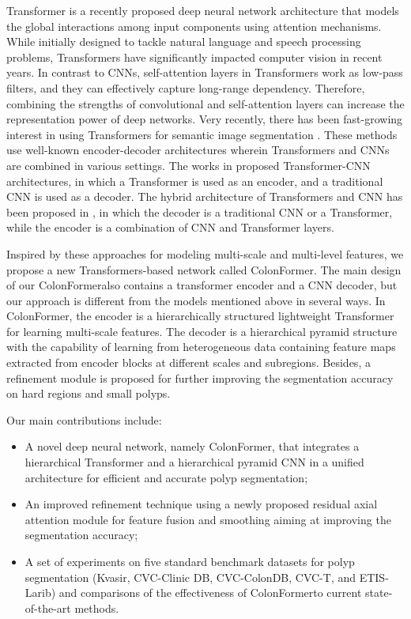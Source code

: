 \documentclass{article}
\newcommand{\ModelName}{ColonFormer}
\begin{document}
Transformer \cite{transformer2017} is a recently proposed deep neural network architecture that models the global interactions among input components using attention mechanisms. While initially designed to tackle natural language and speech processing problems, Transformers have significantly impacted computer vision in recent years. In contrast to CNNs, self-attention layers in Transformers work as low-pass filters, and they can effectively capture long-range dependency. Therefore, combining the strengths of convolutional and self-attention layers can increase the representation power of deep networks. 
Very recently, there has been fast-growing interest in using Transformers for semantic image segmentation \cite{swin,wang2021pyramid, ranftl2021vision, zheng2021rethinking}. These methods use well-known encoder-decoder architectures wherein Transformers and CNNs are combined in various settings. The works in \cite{swin,wang2021pyramid, ranftl2021vision} proposed Transformer-CNN architectures, in which a Transformer is used as an encoder, and a traditional CNN is used as a decoder. The hybrid architecture of Transformers and CNN has been proposed in  \cite{zheng2021rethinking}, in which the decoder is a traditional CNN or a Transformer, while the encoder is a combination of CNN and Transformer layers. 

Inspired by these approaches for modeling multi-scale and multi-level features, we propose a new Transformers-based network called \ModelName. The main design of our \ModelName also contains a transformer encoder and a CNN decoder, but our approach is different from the models mentioned above in several ways. In  \ModelName, the encoder is a hierarchically structured lightweight Transformer for learning multi-scale features. The decoder is a hierarchical pyramid structure with the capability of learning from heterogeneous data containing feature maps extracted from encoder blocks at different scales and subregions. Besides, a refinement module is proposed for further improving the segmentation accuracy on hard regions and small polyps. 

Our main contributions include: 
\begin{itemize}
\item A novel deep neural network, namely \ModelName, that integrates a hierarchical Transformer and a hierarchical pyramid CNN in a unified architecture for efficient and accurate polyp segmentation;
\item An improved refinement technique using a newly proposed residual axial attention module for feature fusion and smoothing aiming at improving the segmentation accuracy;
\item A set of experiments on five standard benchmark datasets for polyp segmentation (Kvasir, CVC-Clinic DB, CVC-ColonDB, CVC-T, and ETIS-Larib) and comparisons of the effectiveness of \ModelName to current state-of-the-art methods.
\end{itemize}
\end{document}
